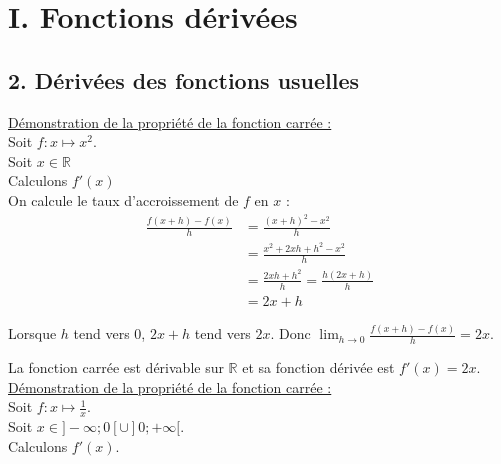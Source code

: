 \documentclass[11pt,a4paper]{article}
\title{\titre}
\author{\classe \\ \theme}
\date{}
\begin{document}
\maketitle
\pagestyle{custom}
\thispagestyle{custom}

\section*{I. Fonctions dérivées}

\subsection*{2. Dérivées des fonctions usuelles}

\underline {Démonstration de la propriété de la fonction carrée :} \\

Soit $f:x \mapsto x^2$. \\
Soit $x\in\mathbb{R}$ \\
Calculons $f'(x)$ \\

On calcule le taux d'accroissement de $f$ en $x$ :
\begin{equation*}
    \begin{split}
        \frac{f(x+h)-f(x)}{h}&=\frac{(x+h)^2-x^2}{h}\\
        &=\frac{x^2+2xh+h^2-x^2}{h}\\
        &=\frac{2xh+h^2}{h}=\frac{h(2x+h)}{h} \\
        &=2x+h
    \end{split}
\end{equation*}

Lorsque $h$ tend vers $0$, $2x+h$ tend vers $2x$. Donc $\displaystyle{\lim_{h\to0}\frac{f(x+h)-f(x)}{h}}=2x$.

La fonction carrée est dérivable sur $\mathbb{R}$ et sa fonction dérivée est $f'(x)=2x$. ~\\

\underline {Démonstration de la propriété de la fonction carrée :} \\

Soit $f:x\mapsto \frac{1}{x}$. \\
Soit $x\in]-\infty;0[\cup]0;+\infty[$. \\
            Calculons $f'(x)$. \\
\end{document}
